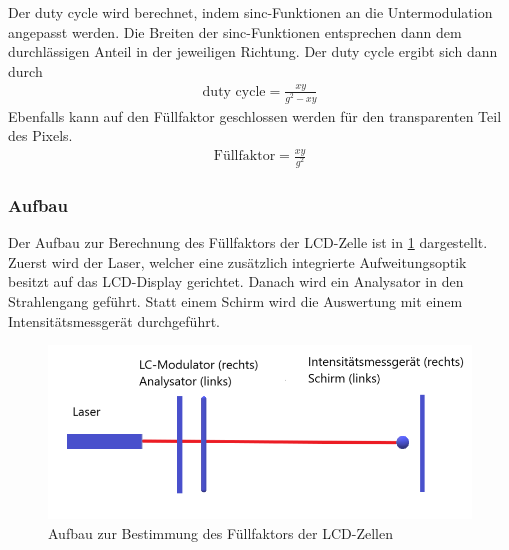 Der duty cycle wird berechnet, indem sinc-Funktionen an die Untermodulation angepasst werden. Die Breiten der sinc-Funktionen entsprechen dann dem durchlässigen Anteil in der jeweiligen Richtung. 
Der duty cycle ergibt sich dann durch
\begin{align}
	\text{duty cycle} = \frac{xy}{g^{2}-xy}
	\label{dutycyc}
\end{align}
Ebenfalls kann auf den Füllfaktor geschlossen werden für den transparenten Teil des Pixels. 
\begin{align}
	\text{Füllfaktor} = \frac{xy}{g^{2}}
	\label{ff}
\end{align}

\subsubsection{Aufbau}
Der Aufbau zur Berechnung des Füllfaktors der LCD-Zelle ist in \cref{422} dargestellt. Zuerst wird der Laser, welcher eine zusätzlich integrierte Aufweitungsoptik besitzt auf das LCD-Display gerichtet. Danach wird ein Analysator in den Strahlengang geführt. Statt einem Schirm wird die Auswertung mit einem Intensitätsmessgerät durchgeführt.
\begin{figure}[h!]
	\centering
	\includegraphics[scale = 1]{4.2.2-Aufbau.png}
	\caption{Aufbau zur Bestimmung des Füllfaktors der LCD-Zellen}
	\label{422}
\end{figure}
